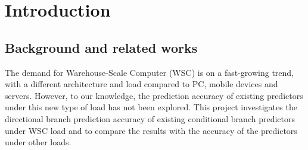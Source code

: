 \chapter{Introduction}  %

\ifpdf
    \graphicspath{{Chapter1/Figs/Raster/}{Chapter1/Figs/PDF/}{Chapter1/Figs/}}
\else
    \graphicspath{{Chapter1/Figs/Vector/}{Chapter1/Figs/}}
\fi


\section{Background and related works} %

The demand for Warehouse-Scale Computer (WSC) is on a fast-growing trend, with a different 
architecture and load compared to PC, mobile devices and servers. However, to our knowledge, the 
prediction accuracy of existing predictors under this new type of load has not been explored. This 
project investigates the directional branch prediction accuracy of existing conditional branch 
predictors under WSC load and to compare the results with the accuracy of the predictors 
under other loads.


